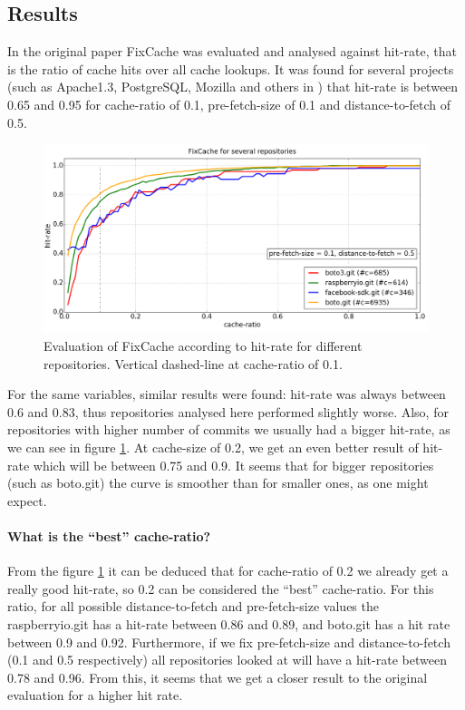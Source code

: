 \documentclass[12pt,twoside,notitlepage]{report}
\newcommand{\fxch}{FixCache}
\begin{document}
\subsection{Results}
In the original paper \fxch{} was evaluated and analysed against hit-rate, that is the ratio of cache hits over all cache lookups. It was found for several projects (such as Apache1.3, PostgreSQL, Mozilla and others in \cite{FixCache}) that hit-rate is between 0.65 and 0.95 for cache-ratio of 0.1, pre-fetch-size of 0.1 and distance-to-fetch of 0.5.
\begin{figure}[h]
\includegraphics[width=1.0\textwidth]{plot_several.png}
\caption[Evaluation of \fxch{} according to hit-rate for different repositories.]{Evaluation of \fxch{} according to hit-rate for different repositories. Vertical dashed-line at cache-ratio of 0.1.}
\label{fig:v5_repos}
\end{figure}

For the same variables, similar results were found: hit-rate was always between 0.6 and 0.83, thus repositories analysed here performed slightly worse. Also, for repositories with higher number of commits we usually had a bigger hit-rate, as we can see in figure \ref{fig:v5_repos}. At cache-size of 0.2, we get an even better result of hit-rate which will be between 0.75 and 0.9. It seems that for bigger repositories (such as boto.git) the curve is smoother than for smaller ones, as one might expect.
\paragraph{What is the ``best'' cache-ratio?}From the figure \ref{fig:v5_repos} it can be deduced that for cache-ratio of 0.2 we already get a really good hit-rate, so 0.2 can be considered the ``best'' cache-ratio. For this ratio, for all possible distance-to-fetch and pre-fetch-size values the raspberryio.git has a hit-rate between 0.86 and 0.89, and boto.git has a hit rate between 0.9 and 0.92. Furthermore, if we fix pre-fetch-size and distance-to-fetch (0.1 and 0.5 respectively) all repositories looked at will have a hit-rate between 0.78 and 0.96. From this, it seems that we get a closer result to the original evaluation for a higher hit rate.
\end{document}
